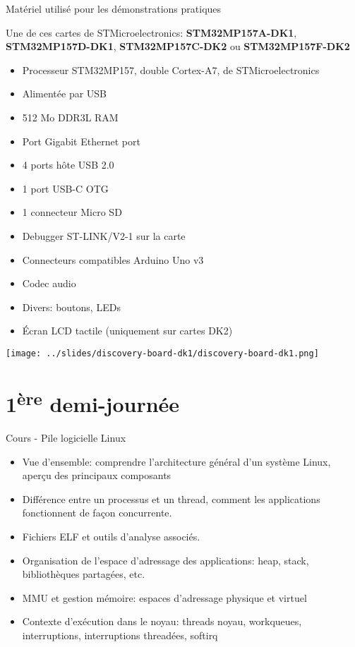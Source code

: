 \documentclass[a4paper,12pt,obeyspaces,spaces,hyphens]{article}
\begin{document}
\feagendatwocolumn
{Matériel utilisé pour les démonstrations pratiques}
{
  Une de ces cartes de STMicroelectronics: {\bf
  STM32MP157A-DK1}, {\bf STM32MP157D-DK1}, {\bf STM32MP157C-DK2} ou
  {\bf STM32MP157F-DK2}
  \begin{itemize}
  \item Processeur STM32MP157, double Cortex-A7, de STMicroelectronics
  \item Alimentée par USB
  \item 512 Mo DDR3L RAM
  \item Port Gigabit Ethernet port
  \item 4 ports hôte USB 2.0
  \item 1 port USB-C OTG
  \item 1 connecteur Micro SD
  \item Debugger ST-LINK/V2-1 sur la carte
  \item Connecteurs compatibles Arduino Uno v3
  \item Codec audio
  \item Divers: boutons, LEDs
  \item Écran LCD tactile (uniquement sur cartes DK2)
  \end{itemize}
}{}
{
  \begin{center}
    \texttt{[image: ../slides/discovery-board-dk1/discovery-board-dk1.png]}
  \end{center}
}

\section{1\textsuperscript{ère} demi-journée}

\feagendaonecolumn
{Cours - Pile logicielle Linux}
{
  \begin{itemize}
  \item Vue d'ensemble: comprendre l'architecture général d'un système
    Linux, aperçu des principaux composants
  \item Différence entre un processus et un thread, comment les
    applications fonctionnent de façon concurrente.
  \item Fichiers ELF et outils d'analyse associés.
  \item Organisation de l'espace d'adressage des applications: heap,
    stack, bibliothèques partagées, etc.
  \item MMU et gestion mémoire: espaces d'adressage physique et
    virtuel
  \item Contexte d'exécution dans le noyau: threads noyau, workqueues,
    interruptions, interruptions threadées, softirq
  \end{itemize}
}
\end{document}

